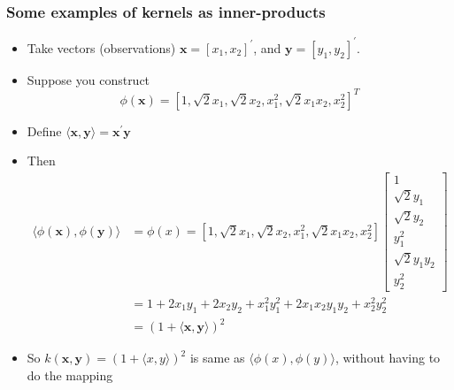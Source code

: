 \documentclass{beamer}
\numberwithin{equation}{section}
\begin{document}
\begin{frame}
\frametitle{Some examples of kernels as inner-products}
\begin{itemize}
  \item<1-> Take vectors (observations) $\boldsymbol{x}=[x_1,x_2]^{'}$, and $\boldsymbol{y}=[y_1,y_2]^{'}$.
  \item<2-> Suppose you construct \footnotesize{$$\phi(\boldsymbol{x})=[1, \sqrt{2} x_1, \sqrt{2}x_2,x_1^2,\sqrt{2}x_1x_2,x_2^2]^T$$}
  \item<3-> Define $\langle \boldsymbol{x}, \boldsymbol{y} \rangle = \boldsymbol{x}^{'}\boldsymbol{y}$ 
  \item<3-> Then
  \footnotesize{
  \begin{align}
    \langle \phi(\boldsymbol{x}),\phi(\boldsymbol{y}) \rangle &= \phi(x)=[1, \sqrt{2} x_1, \sqrt{2}x_2,x_1^2,\sqrt{2}x_1x_2,x_2^2] \left[ \begin{array}{c}
                                                                                                           1  \\
                                                                                                          \sqrt{2} y_1 \\
                                                                                                          \sqrt{2}y_2 \\
                                                                                                          y_1^2 \\
                                                                                                          \sqrt{2}y_1y_2 \\
                                                                                                          y_2^2
                                                                                                        \end{array} \right]  \nonumber \\
  &= 1+2x_1y_1+2x_2y_2+x_1^2y_1^2+2x_1x_2y_1y_2+x_2^2y_2^2 \nonumber \\
  &= (1+\langle \boldsymbol{x},\boldsymbol{y} \rangle)^2  \nonumber
  \end{align} }
  \item<4-> So $k(\boldsymbol{x},\boldsymbol{y})=(1+\langle x,y \rangle)^2$ is same as $\langle \phi(x),\phi(y) \rangle$, without having to do the mapping
\end{itemize}
\end{frame}
\end{document}
